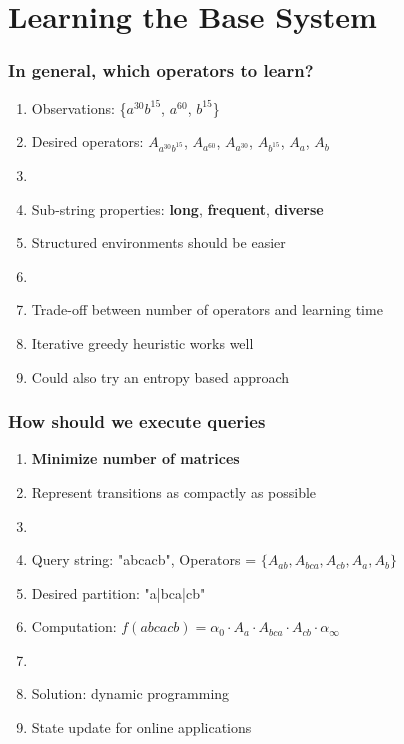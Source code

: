 \documentclass{beamer}
\begin{document}


\section{Learning the Base System}

\begin{frame}
\frametitle{In general, which operators to learn?}
\begin{enumerate}

\item Observations: \{$a^{30}b^{15}$, $a^{60}$, $b^{15}$\}

\item[] Desired operators: $A_{a^{30}b^{15}}$, $A_{a^{60}}$, $A_{a^{30}}$, $A_{b^{15}}$, $A_a$, $A_b$
\item[]

\item Sub-string properties: 
\textbf{long}, \textbf{frequent}, \textbf{diverse}
\item[] Structured environments should be easier
\item[]

\item Trade-off between number of operators and learning time
\item[] Iterative greedy heuristic works well
\item[] Could also try an entropy based approach

\end{enumerate}
\end{frame}


\begin{frame}
\frametitle{How should we execute queries}
\begin{enumerate}

\item \textbf{Minimize number of matrices}
\item[] Represent transitions as compactly as possible 
\item[]

\item Query string: "abcacb", Operators = $\{A_{ab}, A_{bca}, A_{cb}, A_a, A_b \}$ 


\item[] Desired partition: "a|bca|cb"
\item[] Computation: $f(abcacb)=\alpha_0 \cdot A_a \cdot A_{bca} \cdot A_{cb} \cdot \alpha_\infty$ 
\item[]

\item Solution: dynamic programming
\item[] State update for online applications

\end{enumerate}
\end{frame}
\end{document}
